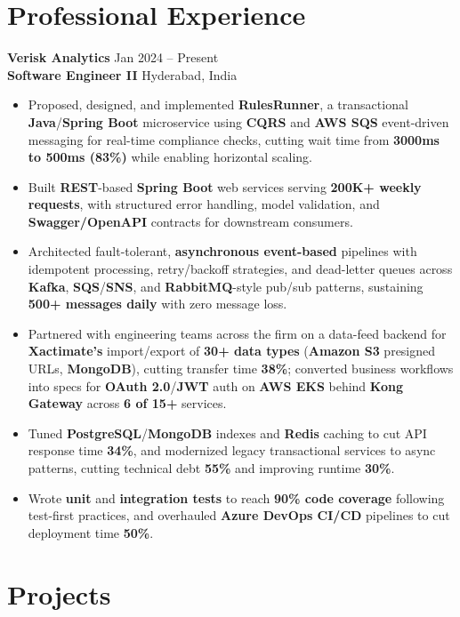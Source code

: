 \documentclass[a4paper,10pt]{article}
\begin{document}
\section*{Professional Experience}

\textbf{Verisk Analytics} \hfill Jan 2024 -- Present \\
\textbf{Software Engineer II} \hfill Hyderabad, India

\begin{itemize}[leftmargin=*]
    \item Proposed, designed, and implemented \textbf{RulesRunner}, a transactional \textbf{Java}/\textbf{Spring Boot} microservice using \textbf{CQRS} and \textbf{AWS SQS} event-driven messaging for real-time compliance checks, cutting wait time from \textbf{3000ms to 500ms (83\%)} while enabling horizontal scaling.
    \item Built \textbf{REST}-based \textbf{Spring Boot} web services serving \textbf{200K+ weekly requests}, with structured error handling, model validation, and \textbf{Swagger/OpenAPI} contracts for downstream consumers.
    \item Architected fault-tolerant, \textbf{asynchronous event-based} pipelines with idempotent processing, retry/backoff strategies, and dead-letter queues across \textbf{Kafka}, \textbf{SQS}/\textbf{SNS}, and \textbf{RabbitMQ}-style pub/sub patterns, sustaining \textbf{500+ messages daily} with zero message loss.
    \item Partnered with engineering teams across the firm on a data-feed backend for \textbf{Xactimate's} import/export of \textbf{30+ data types} (\textbf{Amazon S3} presigned URLs, \textbf{MongoDB}), cutting transfer time \textbf{38\%}; converted business workflows into specs for \textbf{OAuth 2.0}/\textbf{JWT} auth on \textbf{AWS EKS} behind \textbf{Kong Gateway} across \textbf{6 of 15+} services.
    \item Tuned \textbf{PostgreSQL}/\textbf{MongoDB} indexes and \textbf{Redis} caching to cut API response time \textbf{34\%}, and modernized legacy transactional services to async patterns, cutting technical debt \textbf{55\%} and improving runtime \textbf{30\%}.
    \item Wrote \textbf{unit} and \textbf{integration tests} to reach \textbf{90\% code coverage} following test-first practices, and overhauled \textbf{Azure DevOps CI/CD} pipelines to cut deployment time \textbf{50\%}.
\end{itemize}

\section*{Projects}
\end{document}
